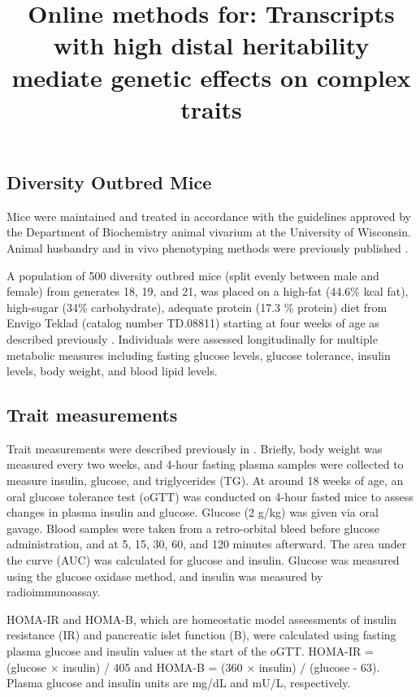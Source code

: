 \documentclass[
]{article}
\title{Online methods for: Transcripts with high distal heritability
mediate genetic effects on complex traits}
\author{}
\date{\vspace{-2.5em}}
\begin{document}
\maketitle

\subsection{Diversity Outbred Mice}\label{diversity-outbred-mice}

Mice were maintained and treated in accordance with the guidelines
approved by the Department of Biochemistry animal vivarium at the
University of Wisconsin. Animal husbandry and in vivo phenotyping
methods were previously published \cite{pmid31343992, pmid29567659}.

A population of 500 diversity outbred mice (split evenly between male
and female) from generates 18, 19, and 21, was placed on a high-fat
(44.6\% kcal fat), high-sugar (34\% carbohydrate), adequate protein
(17.3 \% protein) diet from Envigo Teklad (catalog number TD.08811)
starting at four weeks of age as described previously
\cite{pmid29567659}. Individuals were assessed longitudinally for
multiple metabolic measures including fasting glucose levels, glucose
tolerance, insulin levels, body weight, and blood lipid levels.

\subsection{Trait measurements}\label{trait-measurements}

Trait measurements were described previously in \cite{pmid29567659}.
Briefly, body weight was measured every two weeks, and 4-hour fasting
plasma samples were collected to measure insulin, glucose, and
triglycerides (TG). At around 18 weeks of age, an oral glucose tolerance
test (oGTT) was conducted on 4-hour fasted mice to assess changes in
plasma insulin and glucose. Glucose (2 g/kg) was given via oral gavage.
Blood samples were taken from a retro-orbital bleed before glucose
administration, and at 5, 15, 30, 60, and 120 minutes afterward. The
area under the curve (AUC) was calculated for glucose and insulin.
Glucose was measured using the glucose oxidase method, and insulin was
measured by radioimmunoassay.

HOMA-IR and HOMA-B, which are homeostatic model assessments of insulin
resistance (IR) and pancreatic islet function (B), were calculated using
fasting plasma glucose and insulin values at the start of the oGTT.
HOMA-IR = (glucose \(\times\) insulin) / 405 and HOMA-B = (360
\(\times\) insulin) / (glucose - 63). Plasma glucose and insulin units
are mg/dL and mU/L, respectively.
\end{document}
